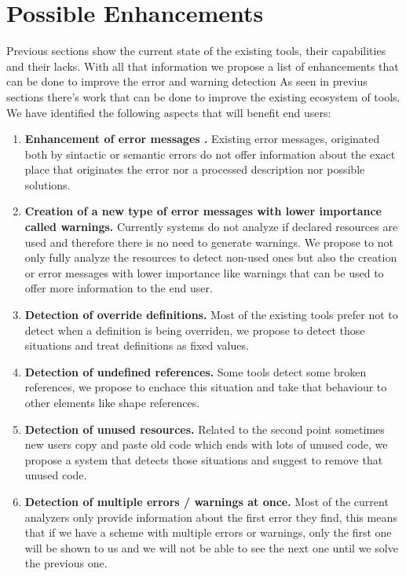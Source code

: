 \section{Possible Enhancements}
Previous sections show the current state of the existing tools, their capabilities and their lacks.
With all that information we propose a list of enhancements that can be done to improve the error and warning detection
As seen in previus sections there's work that can be done to improve the existing ecosystem of tools. We have identified the following aspects
that will benefit end users:

\begin{enumerate}
    \item \textbf{Enhancement of error messages \cite{heeren2005top}.} Existing error messages, originated both by sintactic or semantic errors do not offer information about
    the exact place that originates the error nor a processed description nor possible solutions.

    \item \textbf{Creation of a new type of error messages with lower importance called warnings.} Currently systems do not analyze if declared resources are
    used and therefore there is no need to generate warnings. We propose to not only fully analyze the resources to detect non-used ones but also the creation
    or error messages with lower importance like warnings that can be used to offer more information to the end user.

    \item \textbf{Detection of override definitions.} Most of the existing tools prefer not to detect when a definition is being overriden, we propose to detect those
    situations and treat definitions as fixed values.

    \item \textbf{Detection of undefined references.} Some tools detect some broken references, we propose to enchace this situation and take that behaviour to
    other elements like shape references.

    \item \textbf{Detection of unused resources.} Related to the second point sometimes new users copy and paste old code which ends with lots of unused code,
    we propose a system that detects those situations and suggest to remove that unused code.

    \item \textbf{Detection of multiple errors / warnings at once.} Most of the current analyzers only provide information about the first error they find,
    this means that if we have a scheme with multiple errors or warnings, only the first one will be shown to us and we will not be able to see the next one
    until we solve the previous one. 
\end{enumerate}